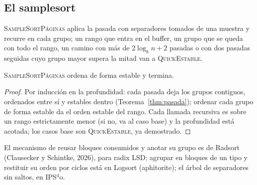 \subsection{El samplesort}
\textsc{SampleSortPáginas} aplica la pasada con separadores tomados de una muestra y recurre en
cada grupo; un rango que entra en el buffer, un grupo que se queda con todo el rango, un camino
con más de $2\log_k n+2$ pasadas o con dos pasadas seguidas cuyo grupo mayor supera la mitad
van a \textsc{QuickEstable}.

\begin{corolario}
\textsc{SampleSortPáginas} ordena de forma estable y termina.
\end{corolario}
\begin{proof}
Por inducción en la profundidad: cada pasada deja los grupos contiguos, ordenados entre sí y
estables dentro (Teorema~\ref{thm:pasada}); ordenar cada grupo de forma estable da el orden
estable del rango. Cada llamada recursiva es sobre un rango estrictamente menor (si no, va al
caso base) y la profundidad está acotada; los casos base son \textsc{QuickEstable}, ya
demostrado.
\end{proof}

El mecanismo de reusar bloques consumidos y anotar su grupo es de Radsort (Clausecker y
Schintke, 2026), para radix LSD; agrupar en bloques de un tipo y restituir su orden por ciclos
está en Logsort (aphitorite); el árbol de separadores sin saltos, en IPS$^4$o.
